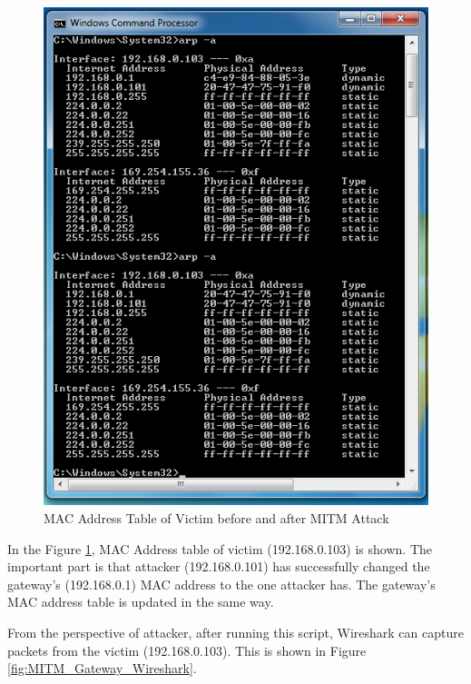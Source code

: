 \documentclass[14pt]{extarticle}
\begin{document}
            \begin{figure}
                \centering
                \includegraphics[width=.95\textwidth]{Pictures/MITM_Gateway/arp.png}
                \caption{MAC Address Table of Victim before and after MITM Attack}
                \label{fig:MITM_Gateway_Arp}
            \end{figure}
            
            In the Figure \ref{fig:MITM_Gateway_Arp}, MAC Address table of victim (192.168.0.103) is shown. The important part is that attacker (192.168.0.101) has successfully changed the gateway's (192.168.0.1) MAC address to the one attacker has. The gateway's MAC address table is updated in the same way.
            
            From the perspective of attacker, after running this script, Wireshark can capture packets from the victim (192.168.0.103). This is shown in Figure \ref{fig:MITM_Gateway_Wireshark}.
            
\end{document}
